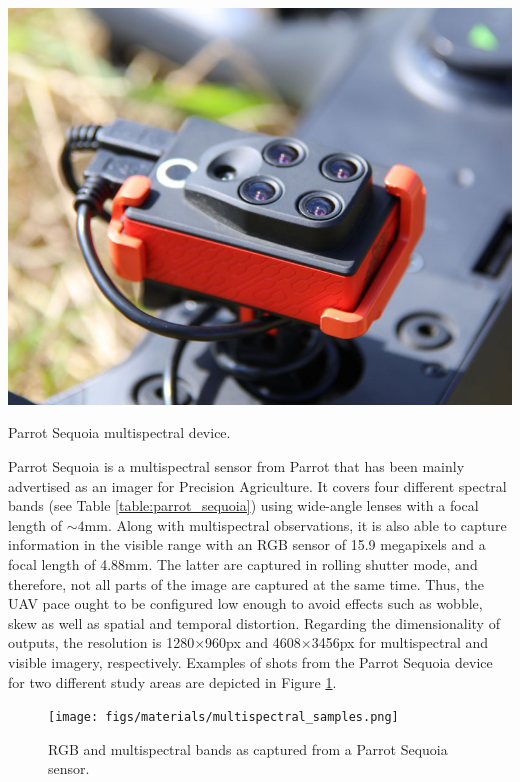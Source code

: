 \begin{marginfigure}[.2cm]
	\includegraphics{figs/materials/sequoia_parrot.jpg}
	\caption{Parrot Sequoia multispectral device.}
	\label{fig:parrot_sequoia}
\end{marginfigure}
Parrot Sequoia is a multispectral sensor from Parrot that has been mainly advertised as an imager for Precision Agriculture. It covers four different spectral bands (see Table \ref{table:parrot_sequoia}) using wide-angle lenses with a focal length of $\sim4$\si{\milli\meter}. Along with multispectral observations, it is also able to capture information in the visible range with an RGB sensor of 15.9 megapixels and a focal length of 4.88\si{\milli\meter}. The latter are captured in rolling shutter mode, and therefore, not all parts of the image are captured at the same time. Thus, the UAV pace ought to be configured low enough to avoid effects such as wobble, skew as well as spatial and temporal distortion. Regarding the dimensionality of outputs, the resolution is 1280$\times$960px and 4608$\times$3456px for multispectral and visible imagery, respectively. Examples of shots from the Parrot Sequoia device for two different study areas are depicted in Figure \ref{fig:multispectral_samples}. 

\begin{figure}[!ht]
	\texttt{[image: figs/materials/multispectral\_samples.png]}
	\caption{RGB and multispectral bands as captured from a Parrot Sequoia sensor.}
	\label{fig:multispectral_samples}
\end{figure}

